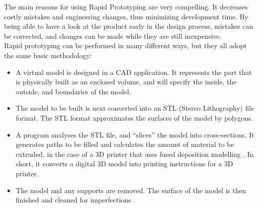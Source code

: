 The main reasons for using Rapid Prototyping are very compelling. It decreases costly mistakes and engineering changes, thus minimizing development time. By being able to have a look at the product early in the design process, mistakes can be corrected, and changes can be made while they are still inexpensive. \\

Rapid prototyping can be performed in many different ways, but they all adopt the same basic methodology:

\begin{itemize} \itemsep0em
  \item A virtual model is designed in a CAD application.  It represents the part that is physically built as an enclosed volume, and will specify the inside, the outside, and boundaries of the model.
  \item The model to be built is next converted into an STL (Stereo Lithography) file format. The STL format approximates the surfaces of the model by polygons.
  \item A program analyses the STL file, and ``slices'' the model into cross-sections. It generates paths to be filled and calculates the amount of material to be extruded, in the case of a 3D printer that uses fused deposition modelling \cite{slic3r}. In short, it converts a digital 3D model into printing instructions for a 3D printer.
  \item The model and any supports are removed. The surface of the model is then finished and cleaned for imperfections \cite{efunda}.
\end{itemize}
